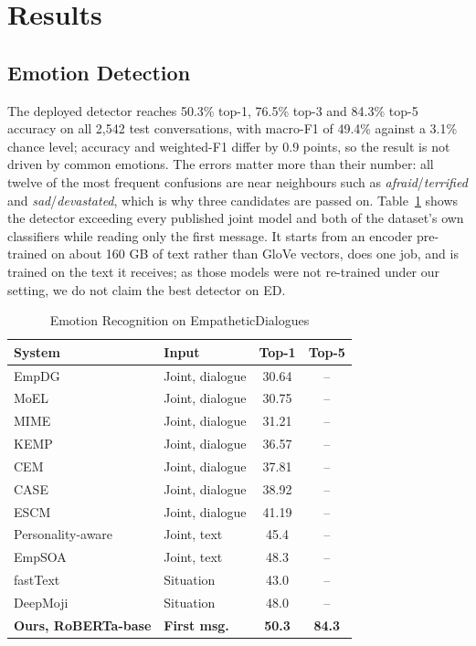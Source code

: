 \section{Results}\label{sec:results}

\subsection{Emotion Detection}
The deployed detector reaches 50.3\% top-1, 76.5\% top-3 and 84.3\% top-5 accuracy on all 2,542 test conversations, with macro-F1 of 49.4\% against a 3.1\% chance level; accuracy and weighted-F1 differ by 0.9 points, so the result is not driven by common emotions. The errors matter more than their number: all twelve of the most frequent confusions are near neighbours such as \textit{afraid}/\textit{terrified} and \textit{sad}/\textit{devastated}, which is why three candidates are passed on. Table~\ref{tab:published} shows the detector exceeding every published joint model and both of the dataset's own classifiers while reading only the first message. It starts from an encoder pre-trained on about 160 GB of text rather than GloVe vectors, does one job, and is trained on the text it receives; as those models were not re-trained under our setting, we do not claim the best detector on ED.

\begin{table}[htbp]
\caption{Emotion Recognition on EmpatheticDialogues}
\begin{center}
\begin{tabular}{|l|l|c|c|}
\hline
\textbf{System} & \textbf{Input} & \textbf{Top-1} & \textbf{Top-5} \\
\hline
EmpDG \cite{li2020empdg} & Joint, dialogue & 30.64 & -- \\
MoEL \cite{lin2019moel} & Joint, dialogue & 30.75 & -- \\
MIME \cite{majumder2020mime} & Joint, dialogue & 31.21 & -- \\
KEMP \cite{li2022kemp} & Joint, dialogue & 36.57 & -- \\
CEM \cite{sabour2022cem} & Joint, dialogue & 37.81 & -- \\
CASE \cite{zhou2023case} & Joint, dialogue & 38.92 & -- \\
ESCM \cite{yang2023escm} & Joint, dialogue & 41.19 & -- \\
Personality-aware \cite{wu2025traits} & Joint, text & 45.4 & -- \\
EmpSOA \cite{wu2025traits} & Joint, text & 48.3 & -- \\
fastText \cite{rashkin2019} & Situation & 43.0 & -- \\
DeepMoji \cite{rashkin2019} & Situation & 48.0 & -- \\
\hline
\textbf{Ours, RoBERTa-base} & \textbf{First msg.} & \textbf{50.3} & \textbf{84.3} \\
\hline
\end{tabular}
\label{tab:published}
\end{center}
\end{table}

